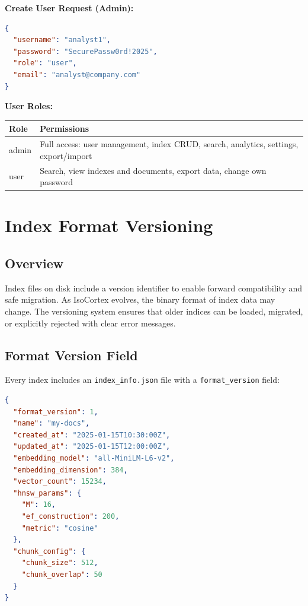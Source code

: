 \documentclass[11pt,a4paper]{article}
\newcommand{\inlinecode}[1]{\texttt{\small\colorbox{ctCodeBg}{#1}}}
\begin{document}
\textbf{Create User Request (Admin):}
\begin{lstlisting}[language=JSON]
{
  "username": "analyst1",
  "password": "SecurePassw0rd!2025",
  "role": "user",
  "email": "analyst@company.com"
}
\end{lstlisting}

\textbf{User Roles:}
\begin{longtable}{@{}p{2.5cm}p{10cm}@{}}
\toprule
\textbf{Role} & \textbf{Permissions} \\
\midrule
\endhead
admin & Full access: user management, index CRUD, search, analytics, settings, export/import \\
user & Search, view indexes and documents, export data, change own password \\
\bottomrule
\end{longtable}

\section{Index Format Versioning}

\subsection{Overview}

Index files on disk include a version identifier to enable forward compatibility and safe migration. As IsoCortex evolves, the binary format of index data may change. The versioning system ensures that older indices can be loaded, migrated, or explicitly rejected with clear error messages.

\subsection{Format Version Field}

Every index includes an \inlinecode{index\_info.json} file with a \inlinecode{format\_version} field:

\begin{lstlisting}[language=JSON]
{
  "format_version": 1,
  "name": "my-docs",
  "created_at": "2025-01-15T10:30:00Z",
  "updated_at": "2025-01-15T12:00:00Z",
  "embedding_model": "all-MiniLM-L6-v2",
  "embedding_dimension": 384,
  "vector_count": 15234,
  "hnsw_params": {
    "M": 16,
    "ef_construction": 200,
    "metric": "cosine"
  },
  "chunk_config": {
    "chunk_size": 512,
    "chunk_overlap": 50
  }
}
\end{lstlisting}
\end{document}
